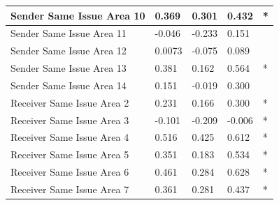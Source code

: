 \documentclass[headsepline=true, abstracton]{scrartcl}
\begin{document}
\begin{table}[htp]
\begin{tabular}{|
>{\columncolor[HTML]{EFEFEF}}l |l|l|l|l|}
Sender Same Issue Area 10                          & 0.369                            & 0.301                               & 0.432                               & *                                    \\ \hline
Sender Same Issue Area 11                          & -0.046                           & -0.233                              & 0.151                               &                                      \\ \hline
Sender Same Issue Area 12                          & 0.0073                           & -0.075                              & 0.089                               &                                      \\ \hline
Sender Same Issue Area 13                          & 0.381                            & 0.162                               & 0.564                               & *                                    \\ \hline
Sender Same Issue Area 14                          & 0.151                            & -0.019                              & 0.300                               &                                      \\ \hline
Receiver Same Issue Area 2                         & 0.231                            & 0.166                               & 0.300                               & *                                    \\ \hline
Receiver Same Issue Area 3                         & -0.101                           & -0.209                              & -0.006                              & *                                    \\ \hline
Receiver Same Issue Area 4                         & 0.516                            & 0.425                               & 0.612                               & *                                    \\ \hline
Receiver Same Issue Area 5                         & 0.351                            & 0.183                               & 0.534                               & *                                    \\ \hline
Receiver Same Issue Area 6                         & 0.461                            & 0.284                               & 0.628                               & *                                    \\ \hline
Receiver Same Issue Area 7                         & 0.361                            & 0.281                               & 0.437                               & *                                    \\ \hline

\end{tabular}
\end{table}
\end{document}
